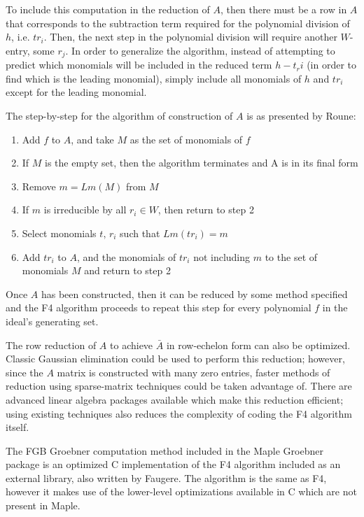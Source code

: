 \documentclass[letterpaper,12pt,titlepage,oneside,final]{book}
\begin{document}
To include this computation in the reduction of ${A}$, then there must be a row in ${A}$ that corresponds to the subtraction term required for the polynomial division of ${h}$, i.e. ${tr_i}$.  Then, the next step in the polynomial division will require another ${W}$-entry, some ${r_j}$.  In order to generalize the algorithm, instead of attempting to predict which monomials will be included in the reduced term ${h - t_ri}$ (in order to find which is the leading monomial), simply include all monomials of ${h}$ and ${tr_i}$ except for the leading monomial.

The step-by-step for the algorithm of construction of ${A}$ is as presented by Roune:
\begin{enumerate}
  \item Add ${f}$ to ${A}$, and take ${M}$ as the set of monomials of ${f}$
  \item If ${M}$ is the empty set, then the algorithm terminates and A is in its final form
  \item Remove $m = {Lm(M)}$ from ${M}$
  \item If ${m}$ is irreducible by all ${r_i \in W}$, then return to step 2
  \item Select monomials ${t,\, r_i}$ such that ${Lm(tr_i) = m}$
  \item Add ${tr_i}$ to ${A}$, and the monomials of ${tr_i}$ not including ${m}$ to the set of monomials ${M}$ and return to step 2
\end{enumerate}

Once ${A}$ has been constructed, then it can be reduced by some method specified and the F4 algorithm proceeds to repeat this step for every polynomial ${f}$ in the ideal's generating set.

The row reduction of ${A}$ to achieve ${\bar A}$ in row-echelon form can also be optimized.  Classic Gaussian elimination could be used to perform this reduction; however, since the ${A}$ matrix is constructed with many zero entries, faster methods of reduction using sparse-matrix techniques could be taken advantage of.  There are advanced linear algebra packages available which make this reduction efficient; using existing techniques also reduces the complexity of coding the F4 algorithm itself.

The FGB Groebner computation method included in the Maple Groebner package is an optimized C implementation of the F4 algorithm included as an external library, also written by Faugere.  The algorithm is the same as F4, however it makes use of the lower-level optimizations available in C which are not present in Maple. 
\end{document}
